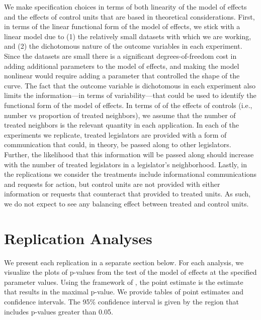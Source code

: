 \documentclass[12pt]{article}
\begin{document}
We make specification choices in terms of both linearity of the model of effects and the effects of control units that are based in theoretical considerations. First, in terms of the linear functional form of the model of effects, we stick with a linear model due to (1) the relatively small datasets with which we are working, and (2) the dichotomous nature of the outcome variables in each experiment. Since the datasets are small there is a significant degrees-of-freedom cost in adding additional parameters to the model of effects, and making the model nonlinear would require adding a parameter that controlled the shape of the curve. The fact that the outcome variable is dichotomous in each experiment also limits the information---in terms of variability---that could be used to identify the functional form of the model of effects. In terms of of the effects of controls (i.e., number vs proportion of treated neighbors), we assume that the number of treated neighbors is the relevant quantity in each application.  In each of the experiments we replicate, treated legislators are provided with a form of communication that could, in theory, be passed along to other legislators. Further, the likelihood that this information will be passed along should increase with the number of treated legislators in a legislator's neighborhood. Lastly, in the replications we consider the treatments include informational communications and requests for action, but control units are not provided with either information or requests that counteract that provided to treated units. As such, we do not expect to see any balancing effect between treated and control units.

\section{Replication Analyses}

We present each replication in a separate section below. For each analysis, we visualize the plots of p-values from the test of the model of effects at the specified parameter values. Using the framework of \citet{bowers2012reasoning}, the point estimate is the estimate that results in the maximal p-value. We provide tables of point estimates and confidence intervals. The 95\% confidence interval is given by the region that includes p-values greater than 0.05.

\subsection{\citet{butler2011can}}
\end{document}
